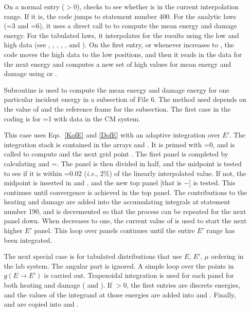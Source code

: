 On a normal entry ($>$0),
 checks to
see whether  is in the current interpolation range.
If it is, the code jumps to statement number 400.  For the
analytic laws (=3 and =6), it uses
a direct call to  to compute the mean energy
and damage energy.  For the tabulated laws, it interpolates
for the results using the low and high data (see ,
, , , , and
).  On the first entry, or whenever 
increases to , the code moves the high data to
the low positions, and then it reads in the data for the
next energy and computes a new set of high values for
mean energy and damage using  or .

Subroutine 
is used to compute the mean energy and damage energy for
one particular incident energy in a subsection of File 6.
The method used depends on the value of  and
the reference frame for the subsection.  The first case
in the coding is for =1 with data in the CM system.

This case uses Eqs.~\ref{KofE} and \ref{DofE} with an
adaptive integration over $E'$.  The integration stack is
contained in the arrays  and .  It is
primed with =0, and  is called to
compute  and the next grid point .
The first panel is completed by calculating  and
=.  The panel is then divided in half, and
the midpoint is tested to see if it is within =0.02
({\it i.e.}, 2\%) of the linearly interpolated value.  If
not, the midpoint is inserted in  and ,
and the new top panel [that is $-$]
is tested.  This continues until convergence is achieved in
the top panel.  The contributions to the heating and damage
are added into the accumulating integrals at statement
number 190, and  is decremented so that the process
can be repeated for the next panel down.  When 
decreases to one, the current value of  is
used to start the next higher $E'$ panel.  This loop over
panels continues until the entire $E'$ range has been
integrated.

The next special case is for tabulated distributions that use
$E$, $E'$, $\mu$ ordering in the lab system.  The angular part
is ignored.  A simple loop over the  points in
$g(E{\rightarrow}E')$ is carried out.  Trapezoidal integration
is used for each panel for both heating and damage (
and ).  If $>$0, the first  entries
are discrete energies, and the values of the integrand at
those energies are added into  and .
Finally,  and  are copied into 
and .

